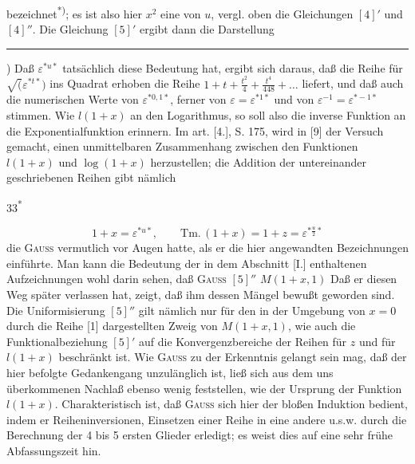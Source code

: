 \noindent bezeichnet\textsuperscript{*)}; es ist also hier $x^2$ eine  von $u$, vergl. oben die Gleichungen $[4]'$ und $[4]''$. Die Gleichung $[5]'$ ergibt dann die Darstellung
\par\smallskip\noindent\rule{.25\linewidth}{.4pt}\par
{\small\par\indent *) Daß $\varepsilon^{*u*}$ tatsächlich diese Bedeutung hat, ergibt sich daraus, daß die Reihe für $\surd(\varepsilon^{*t*})$ ins Quadrat erhoben die Reihe $1+t+\frac{t^2}{4}+\frac{t^4}{448}+\ldots$ liefert, und daß auch die numerischen Werte von $\varepsilon^{*0{,}1*}$, ferner von $\varepsilon=\varepsilon^{*1*}$ und von $\varepsilon^{-1}=\varepsilon^{*-1*}$ stimmen. Wie $l(1+x)$ an den Logarithmus, so soll also die inverse Funktion an die Exponentialfunktion erinnern. Im art. [4.], S. 175, wird in [9] der Versuch gemacht, einen unmittelbaren Zusammenhang zwischen den Funktionen $l(1+x)$ und $\log(1+x)$ herzustellen; die Addition der untereinander geschriebenen Reihen gibt nämlich\par}
\begin{flushright}33\textsuperscript{*}\end{flushright}
\clearpage
{}
\begin{equation*}\tag*{$[5]''$}1+x=\varepsilon^{*u*},\qquad\mathrm{Tm.}\,(1+x)=1+z=\varepsilon^{*\frac u2*}\end{equation*}
\noindent die \textsc{Gauss} vermutlich vor Augen hatte, als er die hier angewandten Bezeichnungen einführte. Man kann die Bedeutung der in dem Abschnitt [I.] enthaltenen Aufzeichnungen wohl darin sehen, daß \textsc{Gauss}  $[5]''$  $M(1+x,1)$  Daß er diesen Weg später verlassen hat, zeigt, daß ihm dessen Mängel bewußt geworden sind. Die Uniformisierung $[5]''$ gilt nämlich nur für den in der Umgebung von $x=0$ durch die Reihe [1] dargestellten Zweig von $M(1+x,1)$, wie auch die Funktionalbeziehung $[5]'$ auf die Konvergenzbereiche der Reihen für $z$ und für $l(1+x)$ beschränkt ist. Wie \textsc{Gauss} zu der Erkenntnis gelangt sein mag, daß der hier befolgte Gedankengang unzulänglich ist, ließ sich aus dem uns überkommenen Nachlaß ebenso wenig feststellen, wie der Ursprung der Funktion $l(1+x)$. Charakteristisch ist, daß \textsc{Gauss} sich hier der bloßen Induktion bedient, indem er Reiheninversionen, Einsetzen einer Reihe in eine andere u.s.w. durch die Berechnung der 4 bis 5 ersten Glieder erledigt; es weist dies auf eine sehr frühe Abfassungszeit hin.
